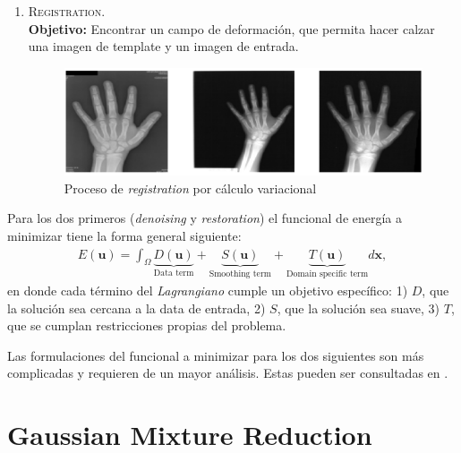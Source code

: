 \begin{enumerate}
    \item \textsc{Registration}. \\ \textbf{Objetivo:} Encontrar un campo de deformación, que permita hacer calzar una imagen de template y un imagen de entrada.
    \begin{figure}[htpb!]
    \centering
    \includegraphics[width=11cm]{registration}
    \caption{Proceso de \textit{registration} por cálculo variacional}
    \label{fig:dendro}
    \end{figure}
\end{enumerate}

Para los dos primeros (\textit{denoising} y \textit{restoration}) el funcional de energía a minimizar tiene la forma general siguiente:
\begin{align}
    E(\mathbf{u}) = \int_{\Omega} \underbrace{D(\mathbf{u})}_{\text{Data term}} + \underbrace{S(\mathbf{u})}_{\text{Smoothing term}} + \underbrace{T(\mathbf{u})}_{\text{Domain specific term}} d\mathbf{x},
\end{align}
en donde cada término del \textit{Lagrangiano} cumple un objetivo específico: 1) $D$, que la solución sea cercana a la data de entrada, 2) $S$, que la solución sea suave, 3) $T$, que se cumplan restricciones propias del problema.

Las formulaciones del funcional a minimizar para los dos siguientes son más complicadas y requieren de un mayor análisis. Estas pueden ser consultadas en \cite{Aubert}.



\section{Gaussian Mixture Reduction}